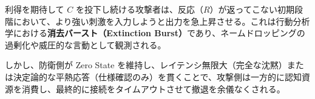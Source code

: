 利得を期待して $C$ を投下し続ける攻撃者は、反応（$R$）が返ってこない初期段階において、より強い刺激を入力しようと出力を急上昇させる。これは行動分析学における\textbf{消去バースト（Extinction Burst）}であり、ネームドロッピングの過剰化や威圧的な言動として観測される。

しかし、防衛側が Zero State を維持し、レイテンシ無限大（完全な沈黙）または決定論的な平熱応答（仕様確認のみ）を貫くことで、攻撃側は一方的に認知資源を消費し、最終的に接続をタイムアウトさせて撤退を余儀なくされる。
